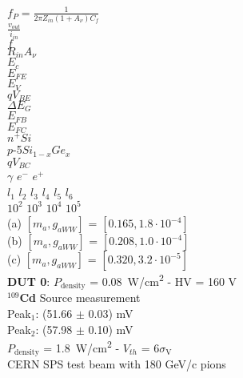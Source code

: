 \documentclass[a4paper, 11pt, twoside]{report}
\begin{document}
	
	$ f_P = \frac{1}{2\pi Z_{in} {\left( 1 + A_\nu \right)C_f}}$ \\
	
	$\frac{v_{out}}{i_{in}}$ \\
	
	$f$ \\
	
	$R_{in} A_{\nu}$ \\
	
	$E_c$\\
	
	$E_{FE}$\\
	
	$E_V$\\
	
	$qV_{BE}$\\
	
	$\Delta E_G$\\
	
	$E_{FB}$\\
	
	$E_{FC}$\\
	
	$n^+ Si$\\
	
	$p$-5$Si_{1-x} Ge_x$\\
	
	$qV_{BC}$\\
	

	$\gamma$
	$e^-$
	$e^+$\\
	
	$l_1$ $l_2$ $l_3$ $l_4$ $l_5$ $l_6$\\
	
	$10^2$ $10^3$ $10^4$ $10^5$ \\
	
	(a) $\left[m_a, g_{aWW}\right]$ = $\left[0.165, 1.8\cdot 10^{-4}\right]$ \\
	
	(b) $\left[m_a, g_{aWW}\right]$ = $\left[0.208, 1.0\cdot 10^{-4}\right]$ \\
	
	(c) $\left[m_a, g_{aWW}\right]$ = $\left[0.320, 3.2\cdot 10^{-5}\right]$ \\
	
	\textbf{DUT 0}: $P_{\text{density}}$ = \SI{0.08}{\watt/\centi\meter^2} - HV = 160 V \\
	
	$^{109}$\textbf{Cd} Source measurement \\
	
	Peak$_1$: (51.66 $\pm$ 0.03) mV \\
	
	Peak$_2$: (57.98 $\pm$ 0.10) mV \\
	
	$P_{\text{density}}$ = \SI{1.8}{\watt/\centi\meter^2} - $V_{th}$ = 6$\sigma_{\text{V}}$ \\
	
	CERN SPS test beam with 180 GeV/c pions
	
	

	
\end{document}
